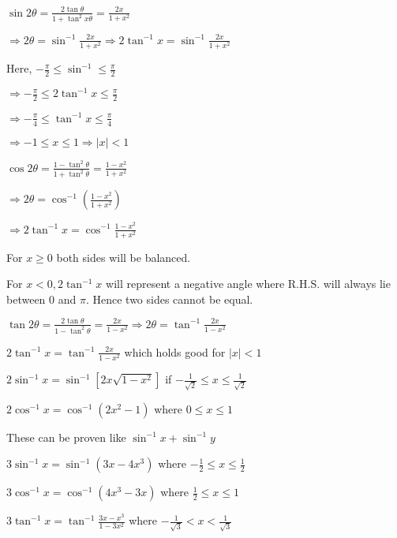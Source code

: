    $\sin2\theta = \frac{2\tan\theta}{1 + \tan^2x\theta} = \frac{2x}{1 + x^2}$

   $\Rightarrow 2\theta = \sin^{-1}\frac{2x}{1 + x^2}\Rightarrow 2\tan^{-1}x = \sin^{-1}\frac{2x}{1 + x^2}$

   Here, $-\frac{\pi}{2}\leq \sin^{-1} \leq \frac{\pi}{2}$

   $\Rightarrow -\frac{\pi}{2}\leq 2\tan^{-1}x\leq \frac{\pi}{2}$

   $\Rightarrow -\frac{\pi}{4}\leq \tan^{-1}x\leq \frac{\pi}{4}$

   $\Rightarrow -1\leq x\leq 1 \Rightarrow |x| < 1$

 \item $\cos2\theta = \frac{1 - \tan^2\theta}{1 + \tan^2\theta} = \frac{1 - x^2}{1 + x^2}$

   $\Rightarrow 2\theta = \cos^{-1}\left(\frac{1 - x^2}{1 + x^2}\right)$

   $\Rightarrow 2\tan^{-1}x = \cos^{-1}\frac{1 - x^2}{1 + x^2}$

   For $x \geq 0$ both sides will be balanced.

   For $x<0, 2\tan^{-1}x$ will represent a negative angle where R.H.S. will always lie between $0$ and $\pi.$
   Hence two sides cannot be equal.

 \item $\tan2\theta = \frac{2\tan\theta}{1 - \tan^2\theta} = \frac{2x}{1 - x^2}\Rightarrow 2\theta = \tan^{-1}\frac{2x}{1 - x^2}$

   $2\tan^{-1}x = \tan^{-1}\frac{2x}{1 - x^2}$ which holds good for $|x|< 1$
 \stopitemize
\stopproof

\starttheorem
  \startitemize[n]
    \item $2\sin^{-1}x = \sin^{-1}[2x\sqrt{1 - x^2}]$ if $-\frac{1}{\sqrt{2}}\leq x\leq \frac{1}{\sqrt{2}}$

    \item $2\cos^{-1}x = \cos^{-1}(2x^2 - 1)$ where $0\leq x \leq 1$
  \stopitemize
\stoptheorem

These can be proven like $\sin^{-1}x + \sin^{-1}y$

\starttheorem
  \startitemize[n]
  \item $3\sin^{-1}x = \sin^{-1}(3x - 4x^3)$ where $-\frac{1}{2}\leq x\leq \frac{1}{2}$

  \item $3\cos^{-1}x = \cos^{-1}(4x^3 - 3x)$ where $\frac{1}{2}\leq x\leq 1$

  \item $3\tan^{-1}x = \tan^{-1}\frac{3x - x^3}{1 - 3x^2}$ where $-\frac{1}{\sqrt{3}}< x < \frac{1}{\sqrt{3}}$
\stopitemize
\stoptheorem

